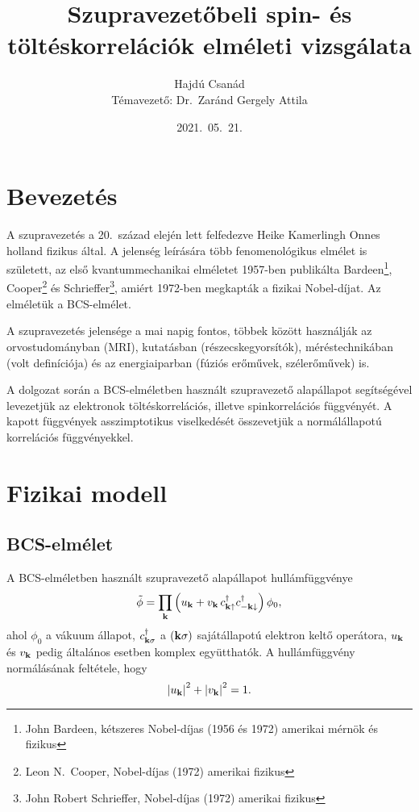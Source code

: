 \documentclass[a4paper,12pt,titlepage]{article}
\title{\bf Szupravezetőbeli spin- és töltéskorrelációk elméleti vizsgálata}
\author{Hajdú Csanád \\ \small Témavezető: Dr.\ Zaránd Gergely Attila}
\date{2021.\ 05.\ 21.}
\newcommand{\KK}{{\vb{k}}}
\begin{document}
\maketitle

\tableofcontents \newpage


\section{Bevezetés}

A szupravezetés a 20.\ század elején lett felfedezve Heike Kamerlingh Onnes holland fizikus által.  A jelenség leírására több fenomenológikus elmélet is született, az első kvantummechanikai elméletet 1957-ben publikálta Bardeen\footnote{John Bardeen, kétszeres Nobel-díjas (1956 és 1972) amerikai mérnök és fizikus}, Cooper\footnote{Leon N.\ Cooper, Nobel-díjas (1972) amerikai fizikus} és Schrieffer\footnote{John Robert Schrieffer, Nobel-díjas (1972) amerikai fizikus}, amiért 1972-ben megkapták a fizikai Nobel-díjat.  Az elméletük a BCS-elmélet.

A szupravezetés jelensége a mai napig fontos, többek között használják az orvostudományban (MRI), kutatásban (részecskegyorsítók), méréstechnikában (volt definíciója) és az energiaiparban (fúziós erőművek, szélerőművek) is.

A dolgozat során a BCS-elméletben használt szupravezető alapállapot segítségével levezetjük az elektronok töltéskorrelációs, illetve spinkorrelációs függvényét.  A kapott függvények asszimptotikus viselkedését összevetjük a normálállapotú korrelációs függvényekkel.


\section{Fizikai modell}

\subsection{BCS-elmélet}

A BCS-elméletben használt szupravezető alapállapot hullámfüggvénye
\begin{equation}
	\tilde{\phi} = \prod\limits_\KK \left( u_\KK + v_\KK \, c_{\KK \uparrow}^\dagger c_{-\KK \downarrow}^\dagger \right) \phi_0,
\end{equation}
ahol $\phi_0$ a vákuum állapot, $c_{\KK \sigma}^\dagger$ a $\left( \KK \sigma \right)$ sajátállapotú elektron keltő operátora, $u_\KK$ és $v_\KK$ pedig általános esetben komplex együtthatók.  A hullámfüggvény normálásának feltétele, hogy
\begin{equation} \label{u-v-norm}
	\left| u_\KK \right|^2 + \left| v_\KK \right|^2 = 1.
\end{equation}
\end{document}
